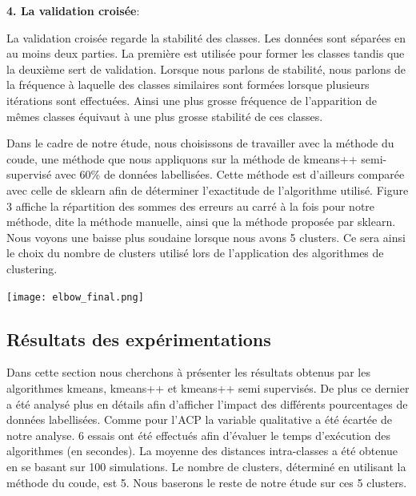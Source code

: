 \documentclass[12pt,a4paper]{book}
\newcommand{\1}{\mathds{1}}
\begin{document}
\begin{description}
\vspace{5 mm}
 	 \item \textbf{4. La validation croisée}:
 	 
La validation croisée regarde la stabilité des classes. Les données sont séparées en au moins deux parties. La première est utilisée pour former les classes tandis que la deuxième sert de validation. Lorsque nous parlons de stabilité, nous parlons de la fréquence à laquelle des classes similaires sont formées lorsque plusieurs itérations sont effectuées. Ainsi une plus grosse fréquence de l’apparition de mêmes classes équivaut à une plus grosse stabilité de ces classes.
 	 
\end{description}

\vspace{10 mm}
\noindent
Dans le cadre de notre étude, nous choisissons de travailler avec la méthode du coude, une méthode que nous appliquons sur la méthode de kmeans++ semi-supervisé avec 60\% de données labellisées. Cette méthode est d'ailleurs comparée avec celle de sklearn afin de déterminer l'exactitude de l'algorithme utilisé. Figure 3 affiche la répartition des sommes des erreurs au carré à la fois pour notre méthode, dite la méthode manuelle, ainsi que la méthode proposée par sklearn. Nous voyons une baisse plus soudaine lorsque nous avons 5 clusters. Ce sera ainsi le choix du nombre de clusters utilisé lors de l'application des algorithmes de clustering.

\begin{center}
\texttt{[image: elbow\_final.png]}
\end{center}

\vspace{10 mm}
\noindent
\begin{large}
\subsection{Résultats des expérimentations}
\end{large}
\vspace{10 mm}

\noindent
Dans cette section nous cherchons à présenter les résultats obtenus par les algorithmes kmeans, kmeans++ et kmeans++ semi supervisés. De plus ce dernier a été analysé plus en détails afin d'afficher l'impact des différents pourcentages de données labellisées. Comme pour l'ACP la variable qualitative a été écartée de notre analyse.
6 essais ont été effectués afin d'évaluer le temps d'exécution des algorithmes (en secondes). La moyenne des distances intra-classes a été obtenue en se basant sur 100 simulations. Le nombre de clusters, déterminé en utilisant la méthode du coude, est 5. Nous baserons le reste de notre étude sur ces 5 clusters.
\end{document}
